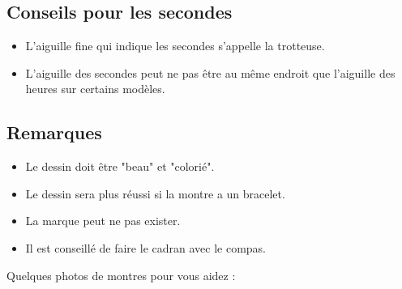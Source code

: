 \subsection*{Conseils pour les secondes}

\begin{itemize}[label={$\bullet$}]
  \item L'aiguille fine qui indique les secondes s'appelle la trotteuse.
  \item L'aiguille des secondes peut ne pas être au même endroit que l'aiguille des heures sur certains modèles. 
\end{itemize}

\subsection*{Remarques}

\begin{itemize}[label={$\bullet$}]
  \item Le dessin doit être "beau" et "colorié".
  \item Le dessin sera plus réussi si la montre a un bracelet.
  \item La marque peut ne pas exister.
  \item Il est conseillé de faire le cadran avec le compas.
\end{itemize}


Quelques photos de montres pour vous aidez : 

